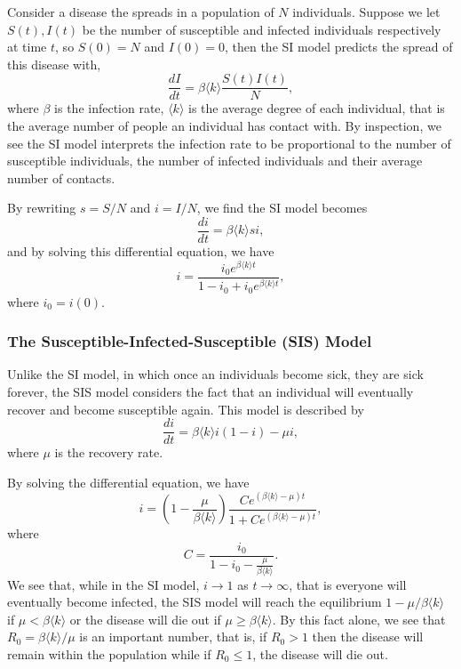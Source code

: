 \documentclass[
]{article}
\theoremstyle{definition}
\begin{document}
Consider a disease the spreads in a population of \(N\) individuals.
Suppose we let \(S(t), I(t)\) be the number of susceptible and infected
individuals respectively at time \(t\), so \(S(0) = N\) and
\(I(0) = 0\), then the SI model predicts the spread of this disease
with, \[\frac{dI}{dt} = \beta \langle k \rangle \frac{S(t) I(t)}{N},\]
where \(\beta\) is the infection rate, \(\langle k \rangle\) is the
average degree of each individual, that is the average number of people
an individual has contact with. By inspection, we see the SI model
interprets the infection rate to be proportional to the number of
susceptible individuals, the number of infected individuals and their
average number of contacts.

By rewriting \(s = S / N\) and \(i = I / N\), we find the SI model
becomes \[\frac{di}{dt} = \beta \langle k \rangle si,\] and by solving
this differential equation, we have
\[i = \frac{i_0 e^{\beta\langle k \rangle t}}{1 - i_0 + i_0 e^{\beta\langle k \rangle t}},\]
where \(i_0 = i(0)\).

\hypertarget{the-susceptible-infected-susceptible-sis-model}{%
\subsubsection{The Susceptible-Infected-Susceptible (SIS)
Model}\label{the-susceptible-infected-susceptible-sis-model}}

Unlike the SI model, in which once an individuals become sick, they are
sick forever, the SIS model considers the fact that an individual will
eventually recover and become susceptible again. This model is described
by \[\frac{di}{dt} = \beta \langle k \rangle i(1 - i) - \mu i,\] where
\(\mu\) is the recovery rate.

By solving the differential equation, we have
\[i = \left(1 - \frac{\mu}{\beta \langle k \rangle}\right)
  \frac{Ce^{(\beta\langle k \rangle - \mu)t}}{1 +Ce^{(\beta\langle k \rangle - \mu)t}},\]
where \[C = \frac{i_0}{1 - i_0 - \frac{\mu}{\beta \langle k \rangle}}.\]
We see that, while in the SI model, \(i \to 1\) as \(t \to \infty\),
that is everyone will eventually become infected, the SIS model will
reach the equilibrium \(1 - \mu / \beta \langle k \rangle\) if
\(\mu < \beta \langle k \rangle\) or the disease will die out if
\(\mu \ge \beta \langle k \rangle\). By this fact alone, we see that
\(R_0 = \beta \langle k \rangle / \mu\) is an important number, that is,
if \(R_0 > 1\) then the disease will remain within the population while
if \(R_0 \le 1\), the disease will die out.
\end{document}
